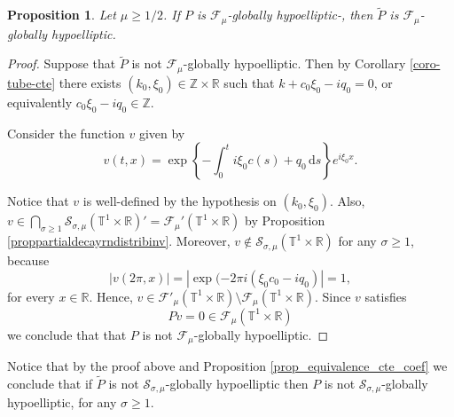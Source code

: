 \documentclass[11pt,reqno]{amsart}
\numberwithin{equation}{section}
\newtheorem{prop}[theorem]{Proposition}
\theoremstyle{definition}
\theoremstyle{definition}
\newcommand{\T}{\mathbb{T}}
\newcommand{\R}{\mathbb{R}}
\newcommand{\Z}{\mathbb{Z}}
\newcommand{\g}{\mathbb{T}^1\times\mathbb{R}}
\newcommand{\Smu}{\mathscr{F}_{\mu}(\T^1\times\R)}
\newcommand{\SSmu}{\mathscr{F}'_{\mu}(\T^1\times\R)}
\begin{document}
\begin{prop}\label{prop-L-GH-implies-tildeL}
    Let $\mu\geq 1/2$. If $P$ is $\mathscr{F}_{\mu}$-globally hypoelliptic-, then $\tilde P$ is $\mathscr{F}_{\mu}$-globally hypoelliptic.
\end{prop}
\begin{proof}
    Suppose that $\tilde{P}$ is not $\mathscr{F}_{\mu}$-globally hypoelliptic. Then by Corollary \ref{coro-tube-cte} there exists $(k_0,\xi_0)\in\Z\times\R$ such that $k+c_0\xi_0-iq_0=0$, or equivalently $c_0\xi_0-iq_0\in\Z$. 
    
    Consider the function $v$ given by
    \[v(t,x) = \exp\left\{-\int_0^{t}i\xi_0c(s)+q_0{\,\mathrm{d}s}\right\}e^{i\xi_0x}.\]

     Notice that $v$ is well-defined by the hypothesis on $(k_0,\xi_0)$. Also, $v\in\bigcap_{\sigma\geq 1}\mathcal{S}_{\sigma,\mu}(\g)'=\mathscr{F}_\mu'(\g)$ by Proposition \ref{proppartialdecayrndistribinv}.
    Moreover, $v\not\in \mathcal{S}_{\sigma,\mu}(\g)$ for any $\sigma\geq 1$, because
    \begin{equation*}
        |v(2\pi,x)|=|\exp(-2\pi i(\xi_0c_0-iq_0)|=1,
    \end{equation*}
    for every $x\in\R$. Hence, $v\in\SSmu\setminus\Smu$. Since $v$ satisfies
	$$Pv=0\in\Smu$$
	we conclude that that $P$ is not $\mathscr{F}_{\mu}$-globally hypoelliptic.
\end{proof}

Notice that by the proof above and Proposition \ref{prop_equivalence_cte_coef}  we conclude that if $\tilde{P}$ is not $\mathcal{S}_{\sigma,\mu}$-globally hypoelliptic then $P$ is not $\mathcal{S}_{\sigma,\mu}$-globally hypoelliptic, for any $\sigma\geq 1$.
\end{document}

